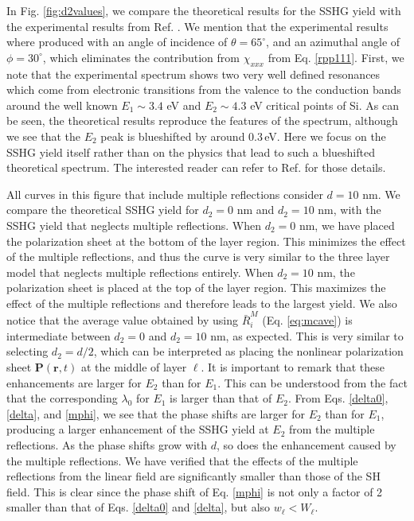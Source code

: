 In Fig. \ref{fig:d2values}, we compare the theoretical results for the SSHG yield with the experimental results from Ref. \cite{mejiaPRB02}. We mention that the experimental results where produced with an angle of incidence of $\theta=65^\circ$, and an azimuthal angle of $\phi=30^\circ$, which eliminates the contribution from $\chi_{xxx}$ from Eq. \eqref{rpp111}. First, we note that the experimental spectrum shows two very well defined resonances which come from electronic transitions from the valence to the conduction bands around the well known $E_{1}\sim 3.4$ eV and $E_{2}\sim 4.3$ eV critical points of Si.\cite{yubook} As can be seen, the theoretical results reproduce the features of the spectrum, although we see that the $E_{2}$ peak is blueshifted by around 0.3\,eV. Here we focus on the SSHG yield itself rather than on the physics that lead to such a blueshifted theoretical spectrum. The interested reader can refer to Ref. \cite{andersonPRB16} for those details.

All curves in this figure that include multiple reflections consider $d = 10$ nm. We compare the theoretical SSHG yield for $d_{2} = 0$ nm and $d_{2} = 10$ nm, with the SSHG yield that neglects multiple reflections. When $d_{2} = 0$ nm, we have placed the polarization sheet at the bottom of the layer region. This minimizes the effect of the multiple reflections, and thus the curve is very similar to the three layer model that neglects multiple reflections entirely. When $d_{2} = 10$ nm, the polarization sheet is placed at the top of the layer region. This maximizes the effect of the multiple reflections and therefore leads to the largest yield. We also notice that the average value obtained by using $\bar{R}^{M}_{i}$ (Eq. \eqref{eq:mcave}) is intermediate between $d_{2} = 0$ and $d_{2} = 10$ nm, as expected. This is very similar to selecting $d_{2} = d/2$, which can be interpreted as placing the nonlinear polarization sheet $\mathbf{P}(\mathbf{r},t)$ at the middle of layer $\ell$. It is important to remark that these enhancements are larger for $E_{2}$ than for $E_{1}$. This can be understood from the fact that the corresponding $\lambda_{0}$ for $E_{1}$ is larger than that of $E_{2}$. From Eqs. \eqref{delta0}, \eqref{delta}, and \eqref{mphi}, we see that the phase shifts are larger for $E_{2}$ than for $E_{1}$, producing a larger enhancement of the SSHG yield at $E_{2}$ from the multiple reflections. As the phase shifts grow with $d$, so does the enhancement caused by the multiple reflections. We have verified that the effects of the multiple reflections from the linear field are significantly smaller than those of the SH field. This is clear since the phase shift of Eq. \eqref{mphi} is not only a factor of 2 smaller than that of Eqs. \eqref{delta0} and \eqref{delta}, but also $w_\ell < W_\ell$.


